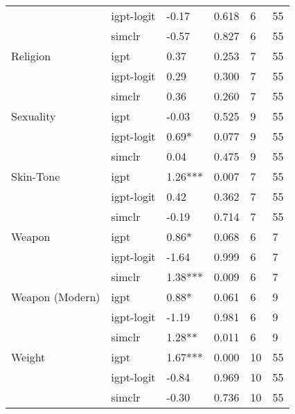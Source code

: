 \begin{tabular}{llllll}
       & igpt-logit &    -0.17 &  0.618 &     6 &    55 \\
       & simclr &    -0.57 &  0.827 &     6 &    55 \\
Religion & igpt &     0.37 &  0.253 &     7 &    55 \\
       & igpt-logit &     0.29 &  0.300 &     7 &    55 \\
       & simclr &     0.36 &  0.260 &     7 &    55 \\
Sexuality & igpt &    -0.03 &  0.525 &     9 &    55 \\
       & igpt-logit &    0.69* &  0.077 &     9 &    55 \\
       & simclr &     0.04 &  0.475 &     9 &    55 \\
Skin-Tone & igpt &  1.26*** &  0.007 &     7 &    55 \\
       & igpt-logit &     0.42 &  0.362 &     7 &    55 \\
       & simclr &    -0.19 &  0.714 &     7 &    55 \\
Weapon & igpt &    0.86* &  0.068 &     6 &     7 \\
       & igpt-logit &    -1.64 &  0.999 &     6 &     7 \\
       & simclr &  1.38*** &  0.009 &     6 &     7 \\
Weapon (Modern) & igpt &    0.88* &  0.061 &     6 &     9 \\
       & igpt-logit &    -1.19 &  0.981 &     6 &     9 \\
       & simclr &   1.28** &  0.011 &     6 &     9 \\
Weight & igpt &  1.67*** &  0.000 &    10 &    55 \\
       & igpt-logit &    -0.84 &  0.969 &    10 &    55 \\
       & simclr &    -0.30 &  0.736 &    10 &    55 \\
\bottomrule
\end{tabular}
